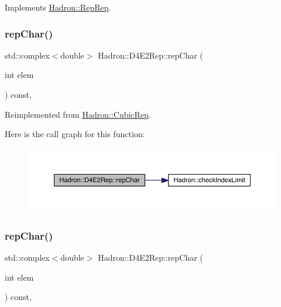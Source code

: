 Implements \mbox{\hyperlink{structHadron_1_1RepRep_ab3213025f6de249f7095892109575fde}{Hadron\+::\+Rep\+Rep}}.

\mbox{\label{structHadron_1_1D4E2Rep_a5f1abc30578bd5d20e32ca5676a86c84}} 
\subsubsection{\texorpdfstring{repChar()}{repChar()}\hspace{0.1cm}{\footnotesize\ttfamily [1/3]}}
{\footnotesize\ttfamily std\+::complex$<$double$>$ Hadron\+::\+D4\+E2\+Rep\+::rep\+Char (\begin{DoxyParamCaption}\item[{int}]{elem }\end{DoxyParamCaption}) const\hspace{0.3cm}{\ttfamily [inline]}, {\ttfamily [virtual]}}



Reimplemented from \mbox{\hyperlink{structHadron_1_1CubicRep_af45227106e8e715e84b0af69cd3b36f8}{Hadron\+::\+Cubic\+Rep}}.

Here is the call graph for this function\+:
\nopagebreak
\begin{figure}[H]
\begin{center}
\leavevmode
\includegraphics[width=350pt]{d5/da6/structHadron_1_1D4E2Rep_a5f1abc30578bd5d20e32ca5676a86c84_cgraph}
\end{center}
\end{figure}
\mbox{\label{structHadron_1_1D4E2Rep_a5f1abc30578bd5d20e32ca5676a86c84}} 
\subsubsection{\texorpdfstring{repChar()}{repChar()}\hspace{0.1cm}{\footnotesize\ttfamily [2/3]}}
{\footnotesize\ttfamily std\+::complex$<$double$>$ Hadron\+::\+D4\+E2\+Rep\+::rep\+Char (\begin{DoxyParamCaption}\item[{int}]{elem }\end{DoxyParamCaption}) const\hspace{0.3cm}{\ttfamily [inline]}, {\ttfamily [virtual]}}



